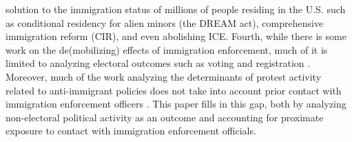 \documentclass[10pt,]{article}
\begin{document}
solution to the immigration status of millions of people residing in the
U.S. such as conditional residency for alien minors (the DREAM act),
comprehensive immigration reform (CIR), and even abolishing ICE. Fourth,
while there is some work on the de(mobilizing) effects of immigration
enforcement, much of it is limited to analyzing electoral outcomes such
as voting and registration
\citep{whitewhen2016, amuedo-dorantesinterior2017}. Moreover, much of
the work analyzing the determinants of protest activity related to
anti-immigrant policies does not take into account prior contact with
immigration enforcement officers \citep{zepeda-millanlatino2017}. This
paper fills in this gap, both by analyzing non-electoral political
activity as an outcome and accounting for proximate exposure to contact
with immigration enforcement officials.
\newpage
\singlespacing 
\renewcommand\refname{References}

\end{document}
